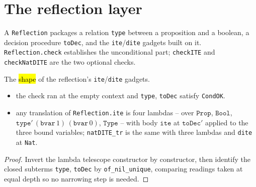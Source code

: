 \section{The reflection layer}

A \texttt{Reflection} packages a relation \texttt{type} between a proposition and a boolean, a
decision procedure \texttt{toDec}, and the \texttt{ite}/\texttt{dite} gadgets built on it.
\texttt{Reflection.check} establishes the unconditional part; \texttt{checkITE} and
\texttt{checkNatDITE} are the two optional checks.

\begin{theorem}
  \label{prim-cond:thm:reflection-ite-tr}
  \leanok

   The \hl{shape} of the reflection's \texttt{ite}/\texttt{dite} gadgets.
  \begin{itemize}
  \item {} the check ran at the empty context and \texttt{type}, \texttt{toDec} satisfy
    \texttt{CondOK}.
  \item {} any translation of \texttt{Reflection.ite} is four lambdas -- over
    $\mathtt{Prop}$, $\mathtt{Bool}$, $\mathtt{type}'\,(\mathtt{bvar}\,1)\,(\mathtt{bvar}\,0)$,
    $\mathtt{Type}$ -- with body $\mathtt{ite}$ at $\mathtt{toDec}'$ applied to the three bound
    variables; \texttt{natDITE\_tr} is the same with three lambdas and \texttt{dite} at
    \texttt{Nat}.
  \end{itemize}
\end{theorem}
\begin{proof}
  \leanok
   Invert the lambda telescope constructor by constructor, then identify the closed
  subterms \texttt{type}, \texttt{toDec} by \texttt{of\_nil\_unique}, comparing readings taken at
  equal depth so no narrowing step is needed.
\end{proof}


